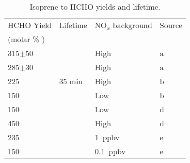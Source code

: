       \begin{table} \begin{threeparttable}
          \caption{ Isoprene to HCHO yields and lifetime.}%
          \begin{tabular}{  l  l  l  l  }
            \toprule
            HCHO Yield    & Lifetime     & NO$_x$ background & Source   \\
            (molar \% )   &              &                   &          \\
            \midrule 
            315$\pm$50      &            & High          & a        \\ 
            285$\pm$30      &            & High          & a        \\ 
            225             & 35 min     & High          & b        \\ %
            150             &            & Low           & b        \\ %
            150             &            & Low           & d        \\
            450             &            & High          & d        \\
            235             &            & 1~ppbv        & e        \\
            150             &            & 0.1~ppbv      & e        \\

\end{tabular}
\end{threeparttable}
\end{table}
